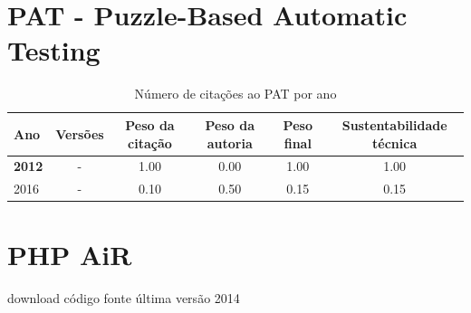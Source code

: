 \section{PAT - Puzzle-Based Automatic Testing}


\begin{table}[H]
\caption{Número de citações ao PAT  por ano}
\centering
\begin{tabular}{| l | c | c | c | c | c |}
  \hline
  Ano & Versões & Peso da citação & Peso da autoria & Peso final & Sustentabilidade técnica \\
  \hline
            {\bf 2012}
          &
          -
          &
          1.00
          &
          0.00
          &
          1.00
          &
            {\color{blue} 1.00}
          \\
\hline
            2016
          &
          -
          &
          0.10
          &
          0.50
          &
          0.15
          &
            {\color{red} 0.15}
          \\
\hline
\end{tabular}
\end{table}



\section{PHP AiR}
\checkmark download
\checkmark código fonte
\checkmark última versão 2014


